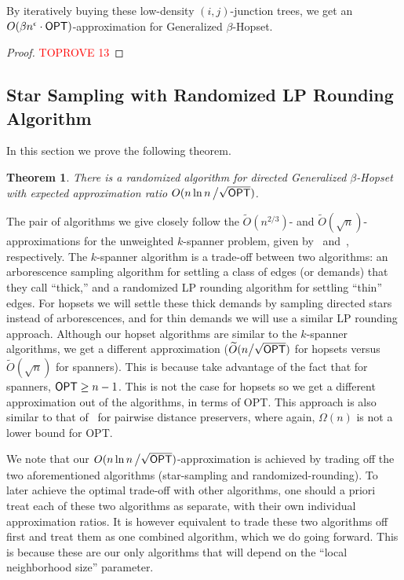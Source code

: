 \documentclass{article}
\newtheorem{theorem}{Theorem}[section]
\theoremstyle{definition}
\theoremstyle{remark}
\def\opt {{\sf OPT}}
\def\hopset {{\sc Generalized $\beta$-Hopset}}
\begin{document}
By iteratively buying these low-density $(i,j)$-junction trees, we get an  $O(\beta n^\epsilon \cdot {{\opt}} )$-approximation for {\hopset}.

\begin{proof}\textcolor{red}{TOPROVE 13}\end{proof}




 
\subsection{Star Sampling with Randomized LP Rounding Algorithm} \label{sec:star_sampling_rounding}


In this section we prove the following theorem.

\begin{theorem} \label{thm:bbmry_alg}
    There is a randomized algorithm for directed {\hopset} with expected approximation ratio $O( n \ln{n} \, \big/ \sqrt{\opt})$.
\end{theorem}

The pair of algorithms we give closely follow the $\widetilde{O}(n^{2/3})$- and $\widetilde{O}(\sqrt{n})$-approximations for the unweighted $k$-spanner problem, given by~\cite{DK11} and~\cite{BBMRY11}, respectively. The $k$-spanner algorithm is a trade-off between two algorithms: an arborescence sampling algorithm for settling a class of edges (or demands) that they call ``thick,'' and a randomized LP rounding algorithm for settling ``thin'' edges. For hopsets we will settle these thick demands by sampling directed stars instead of arborescences, and for thin demands we will use a similar LP rounding approach. Although our hopset algorithms are similar to the $k$-spanner algorithms, we get a different approximation ($\widetilde{O}( n \big/ \sqrt{\opt})$ for hopsets versus $\widetilde{O}(\sqrt{n})$ for spanners). This is because \cite{DK11, BBMRY11} take advantage of the fact that for spanners, ${\opt} \geq n-1$. This is not the case for hopsets so we get a different approximation out of the algorithms, in terms of {\opt}. This approach is also similar to that of~\cite{CDKL20} for pairwise distance preservers, where again, $\Omega(n)$ is not a lower bound for {\opt}.

We note that our $O( n \ln{n} \, \big/ \sqrt{\opt})$-approximation is achieved by trading off the two aforementioned algorithms (star-sampling and randomized-rounding). To later achieve the optimal trade-off with other algorithms, one should a priori treat each of these two algorithms as separate, with their own individual approximation ratios. It is however equivalent to trade these two algorithms off first and treat them as one combined algorithm, which we do going forward. This is because these are our only algorithms that will depend on the ``local neighborhood size'' parameter.
\end{document}
